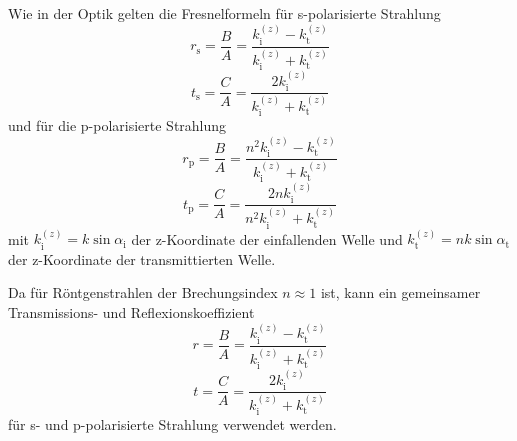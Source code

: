 \documentclass[captions=tableheading]{scrartcl}
\newcommand{\indx}[1]{\text{#1}}
\begin{document}
Wie in der Optik gelten die Fresnelformeln für s-polarisierte Strahlung
\begin{equation}
r_{\indx{s}}= \frac{B}{A}= \frac{k_{\indx{i}}^{\left(z\right)}-k_{\indx{t}}^{\left(z\right)}}{k_{\indx{i}}^{\left(z\right)}+k_{\indx{t}}^{\left(z\right)}}
\end{equation}
\begin{equation}
t_{\indx{s}}= \frac{C}{A}= \frac{2k_{\indx{i}}^{\left(z\right)}}{k_{\indx{i}}^{\left(z\right)}+k_{\indx{t}}^{\left(z\right)}}
\end{equation}
und für die p-polarisierte Strahlung 
\begin{equation}
r_{\indx{p}}= \frac{B}{A}= \frac{n^2 k_{\indx{i}}^{\left(z\right)}- k_{\indx{t}}^{\left(z\right)}}{k_{\indx{i}}^{\left(z\right)}+k_{\indx{t}}^{\left(z\right)}}
\end{equation}
\begin{equation}
t_{\indx{p}}= \frac{C}{A}= \frac{2nk_{\indx{i}}^{\left(z\right)}}{n^2k_{\indx{i}}^{\left(z\right)}+k_{\indx{t}}^{\left(z\right)}}
\end{equation}
mit $k_{\indx{i}}^{\left(z\right)}=k\sin \alpha_{\indx{i}}$ der z-Koordinate der einfallenden Welle und $k_{\indx{t}}^{\left(z\right)}=nk\sin \alpha_{\indx{t}}$ der z-Koordinate der transmittierten Welle.

Da für Röntgenstrahlen der Brechungsindex $n\approx 1$ ist, kann ein gemeinsamer Transmissions- und Reflexionskoeffizient 
\begin{equation}
r= \frac{B}{A}= \frac{k_{\indx{i}}^{\left(z\right)}- k_{\indx{t}}^{\left(z\right)}}{k_{\indx{i}}^{\left(z\right)}+k_{\indx{t}}^{\left(z\right)}}
\end{equation}
\begin{equation}
t= \frac{C}{A}= \frac{2k_{\indx{i}}^{\left(z\right)}}{k_{\indx{i}}^{\left(z\right)}+k_{\indx{t}}^{\left(z\right)}}
\end{equation}
für s- und p-polarisierte Strahlung verwendet werden. 
\end{document}

